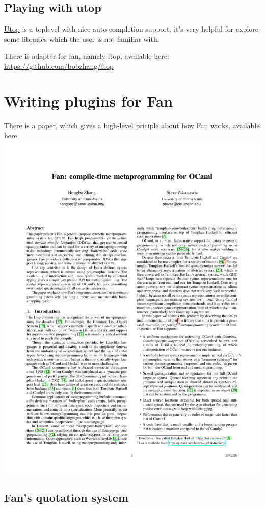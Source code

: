 \documentclass[11pt]{article}
\begin{document}
\subsection{Playing with utop}
\label{sec-4-2}
\href{https://github.com/diml/utop}{Utop} is a toplevel with nice auto-completion support, it's very
helpful for explore some libraries which the user is not familiar
with.

There is adapter for fan, namely ftop, available here:
\url{https://github.com/bobzhang/ftop}
\section{Writing plugins for Fan}
\label{sec-5}

There is a paper, which gives a high-level priciple about how Fan
works, available here \includegraphics[width=.9\linewidth]{pdf/metaprogramming_for_ocaml.pdf}


\subsection{Fan's quotation system}
\label{sec-5-1}
\end{document}
